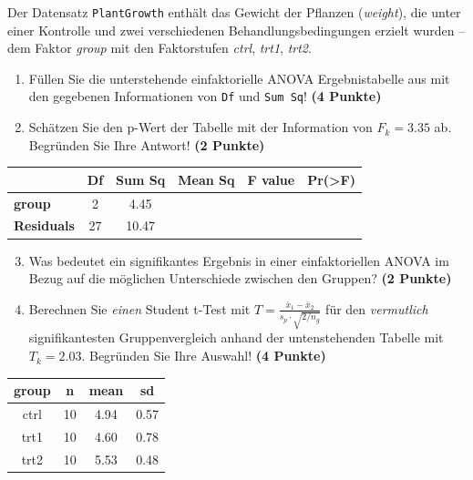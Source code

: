 \documentclass[a4paper, 10pt]{scrartcl}\usepackage[]{graphicx}\usepackage[]{xcolor}
\newenvironment{knitrout}{}{} %
\begin{document}
Der Datensatz \texttt{PlantGrowth} enth{\"a}lt das Gewicht der Pflanzen
(\textit{weight}), die unter einer Kontrolle und zwei verschiedenen
Behandlungsbedingungen erzielt wurden -- dem Faktor \textit{group} mit den
Faktorstufen \textit{ctrl}, \textit{trt1}, \textit{trt2}.



\begin{enumerate}
\item F{\"u}llen Sie die unterstehende einfaktorielle ANOVA Ergebnistabelle aus
  mit den gegebenen Informationen von \texttt{Df} und \texttt{Sum Sq}!
  \textbf{(4 Punkte)}
\item Sch{\"a}tzen Sie den p-Wert der Tabelle mit der Information von
  $F_k = 3.35$ ab. Begr{\"u}nden Sie Ihre
  Antwort! \textbf{(2 Punkte)}
\end{enumerate}

\vspace{1Ex}

\begin{center}
  \Large
  \begin{tabular}{l|c|c|c|c|c}
     & \textbf{Df} & \textbf{Sum Sq} & \textbf{Mean Sq} & \textbf{F value} & \textbf{Pr(>F)} \strut\\
    \hline
   \textbf{group}  & 2 & 4.45 &  &  &  \strut\\
    \hline
   \textbf{Residuals}  & 27 & 10.47 &  &  &  \strut\\
  \end{tabular}
\end{center}

\vspace{1Ex}

\begin{enumerate}
  \setcounter{enumi}{2}
\item Was bedeutet ein signifikantes Ergebnis in einer einfaktoriellen
  ANOVA im Bezug auf die m{\"o}glichen Unterschiede zwischen den Gruppen?
  \textbf{(2 Punkte)}
\item Berechnen Sie \textit{einen} Student t-Test mit $T = \tfrac{\bar{x}_1
  - \bar{x}_2}{s_p \cdot \sqrt{2/n_g}}$ f{\"u}r den \textit{vermutlich}
  signifikantesten Gruppenvergleich anhand der untenstehenden Tabelle mit
  $T_k = 2.03$. Begr{\"u}nden Sie Ihre Auswahl! \textbf{(4 Punkte)}
\end{enumerate}

\begin{knitrout}
\color{fgcolor}\begin{table}[!h]
\centering
\begin{tabular}{cccc}
\toprule
group & n & mean & sd\\
\midrule
ctrl & 10 & 4.94 & 0.57\\
trt1 & 10 & 4.60 & 0.78\\
trt2 & 10 & 5.53 & 0.48\\
\bottomrule
\end{tabular}
\end{table}

\end{knitrout}
\end{document}
